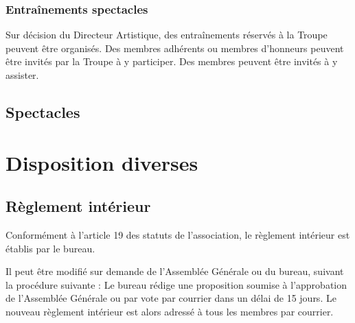\documentclass[a4paper,french,10pt]{article}
\begin{document}
\subsubsection{Entraînements spectacles}
Sur décision du Directeur Artistique, des entraînements réservés à la Troupe peuvent être organisés. Des membres adhérents ou membres d'honneurs peuvent être invités par la Troupe à y participer. Des membres peuvent être invités à y assister.

\subsection{Spectacles}
\label{sec:spectacles}


\section{Disposition diverses}
\subsection{Règlement intérieur}
Conformément à l'article 19 des statuts de l'association, le règlement intérieur est établis par le bureau.

Il peut être modifié sur demande de l'Assemblée Générale ou du bureau, suivant la procédure suivante :
Le bureau rédige une proposition soumise à l'approbation de l'Assemblée Générale ou par vote par courrier dans un délai de 15 jours.
Le nouveau règlement intérieur est alors adressé à tous les membres par courrier.
\end{document}
